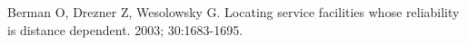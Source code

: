 \begin{thebibliography}{99} %

Berman O, Drezner Z, Wesolowsky G.
\newblock Locating service facilities whose reliability is distance dependent.
 2003; 30:1683-1695.

\end{thebibliography}